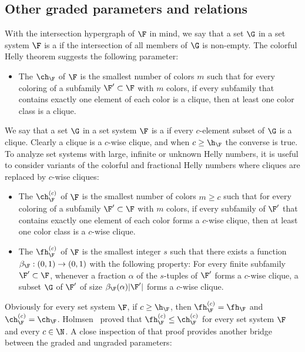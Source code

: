 \subsection{Other graded parameters and relations}\label{s:graded2}
%
With the intersection hypergraph of $\F$ in mind, we say that a set $\G$ in a set system $\F$ is a  if the intersection of all members of $\G$ is non-empty. The colorful Helly theorem suggests the following parameter:
%
\begin{itemize}
\item The  $\ch_\F$ of $\F$ is the smallest number of colors $m$ such that for every coloring of a subfamily $\F'\subset \F$ with $m$ colors, if every subfamily that contains exactly one element of each color is a clique, then at least one color class is a clique.
\end{itemize}
%
\noindent
We say that a set $\G$ in a set system $\F$ is a  if every $c$-element subset of $\G$ is a clique. Clearly a clique is a $c$-wise clique, and when $c \ge \h_\F$ the converse is true. To analyze  set systems with large, infinite or unknown Helly numbers, it is useful to consider variants of the colorful and fractional Helly numbers where cliques are replaced by $c$-wise cliques:
%
\begin{itemize}
\item The  $\ch^{(c)}_\F$ of $\F$ is the smallest number of colors $m \geq c$ such that for every coloring of a subfamily $\F'\subset \F$ with $m$ colors, if every subfamily of $\F'$ that contains exactly one element of each color forms a $c$-wise clique, then at least one color class is a $c$-wise clique.\medskip
%
\item The  $\fh^{(c)}_\F$ of $\F$ is the smallest integer $s$ such that there exists a function $\beta_\F:(0,1)\rightarrow (0,1)$ with the following property: For every finite subfamily $\F'\subset \F$, whenever a fraction $\alpha$ of the $s$-tuples of $\F'$ forms a $c$-wise clique, a subset $\G$ of $\F'$ of size $\beta_\F(\alpha)|\F'|$ forms a $c$-wise clique. \medskip
\end{itemize}
%
\noindent
Obviously for every set system $\F$, if $c \ge \h_\F$, then $\fh^{(c)}_\F = \fh_\F$ and $\ch^{(c)}_\F = \ch_\F$. Holmsen~\cite[Theorem~1.2]{Holmsen2020} proved that $\fh^{(c)}_\F\leq \ch^{(c)}_\F$ for every set system $\F$ and every $c\in\N$. A close inspection of that proof provides another bridge between the graded and ungraded parameters:

